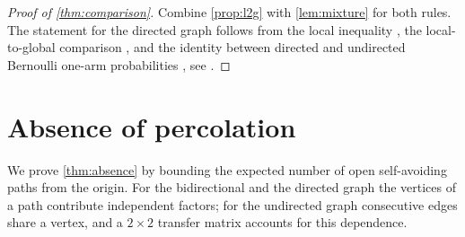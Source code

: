 \documentclass[11pt,letterpaper]{article}
\begin{document}
\begin{proof}[Proof of \cref{thm:comparison}]
Combine \cref{prop:l2g} with \cref{lem:mixture} for both rules. The statement for the directed graph follows from the local inequality \cite[Corollary~3.3]{BJKLRT25}, the local-to-global comparison \cite[Theorem~2.1]{BJKLRT25}, and the identity between directed and undirected Bernoulli one-arm probabilities \cite[Lemma~3.5]{BJKLRT25}, see \cite[Corollary~3.7]{BJKLRT25}.
\end{proof}

\section{Absence of percolation}\label{sec:absence}

We prove \cref{thm:absence} by bounding the expected number of open self-avoiding paths from the origin. For the bidirectional and the directed graph the vertices of a path contribute independent factors; for the undirected graph consecutive edges share a vertex, and a $2\times2$ transfer matrix accounts for this dependence.
\end{document}
